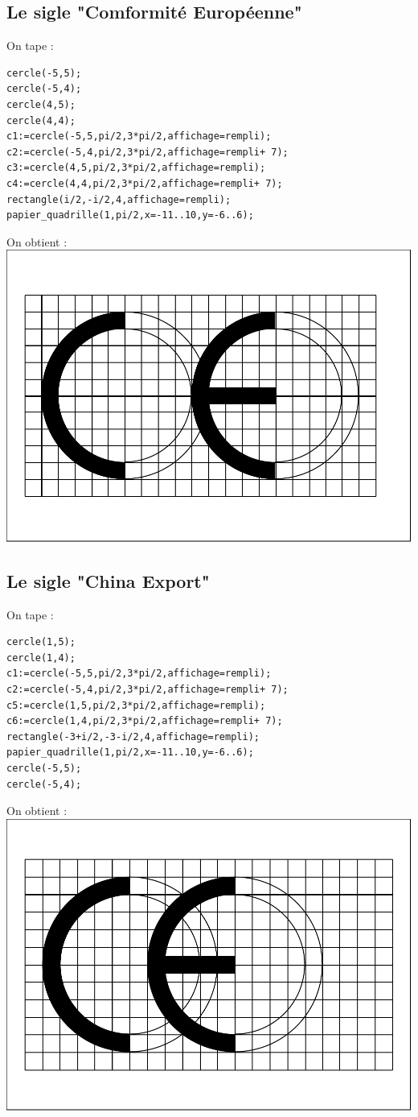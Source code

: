 \documentclass[a4paper,11pt]{book}
\begin{document}
\subsection{Le sigle "Comformit\'e Europ\'eenne"}
On tape :
\begin{verbatim}
cercle(-5,5);
cercle(-5,4);
cercle(4,5);
cercle(4,4);
c1:=cercle(-5,5,pi/2,3*pi/2,affichage=rempli);
c2:=cercle(-5,4,pi/2,3*pi/2,affichage=rempli+ 7);
c3:=cercle(4,5,pi/2,3*pi/2,affichage=rempli);
c4:=cercle(4,4,pi/2,3*pi/2,affichage=rempli+ 7);
rectangle(i/2,-i/2,4,affichage=rempli);
papier_quadrille(1,pi/2,x=-11..10,y=-6..6);
\end{verbatim}
On obtient :\\
\includegraphics[width=\textwidth]{siglecee}
\subsection{Le sigle "China Export"}
On tape :
\begin{verbatim}
cercle(1,5);
cercle(1,4);
c1:=cercle(-5,5,pi/2,3*pi/2,affichage=rempli);
c2:=cercle(-5,4,pi/2,3*pi/2,affichage=rempli+ 7);
c5:=cercle(1,5,pi/2,3*pi/2,affichage=rempli);
c6:=cercle(1,4,pi/2,3*pi/2,affichage=rempli+ 7);
rectangle(-3+i/2,-3-i/2,4,affichage=rempli);
papier_quadrille(1,pi/2,x=-11..10,y=-6..6);
cercle(-5,5);
cercle(-5,4);
\end{verbatim}
On obtient :\\
\includegraphics[width=\textwidth]{siglecec}
\end{document}
